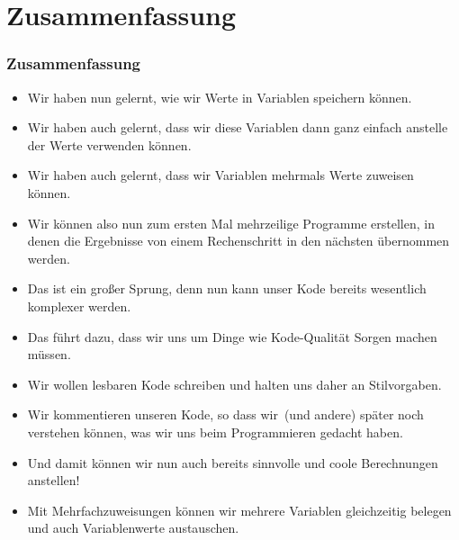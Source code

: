 \documentclass[aspectratio=169,mathserif,notheorems]{beamer}%
\begin{document}
\section{Zusammenfassung}%
%
\begin{frame}%
\frametitle{Zusammenfassung}%
\begin{itemize}%
\item Wir haben nun gelernt, wie wir Werte in Variablen speichern können.%
\item<2-> Wir haben auch gelernt, dass wir diese Variablen dann ganz einfach anstelle der Werte verwenden können.%
\item<3-> Wir haben auch gelernt, dass wir Variablen mehrmals Werte zuweisen können.%
\item<4-> Wir können also nun zum ersten Mal mehrzeilige Programme erstellen, in denen die Ergebnisse von einem Rechenschritt in den nächsten übernommen werden.%
\item<5-> Das ist ein großer Sprung, denn nun kann unser Kode bereits wesentlich komplexer werden.%
\item<6-> Das führt dazu, dass wir uns um Dinge wie Kode-Qualität Sorgen machen müssen.%
\item<7-> Wir wollen lesbaren Kode schreiben und halten uns daher an Stilvorgaben.%
\item<8-> Wir kommentieren unseren Kode, so dass wir~(und andere) später noch verstehen können, was wir uns beim Programmieren gedacht haben.%
\item<9-> Und damit können wir nun auch bereits sinnvolle und coole Berechnungen anstellen!%
\item<10-> Mit Mehrfachzuweisungen können wir mehrere Variablen gleichzeitig belegen und auch Variablenwerte austauschen.%
\end{itemize}%
\end{frame}%
%
\endPresentation%
\end{document}
